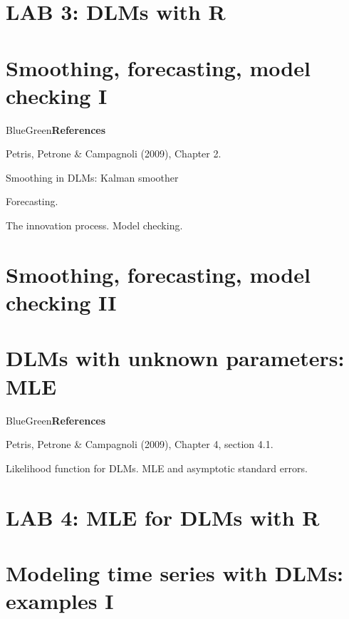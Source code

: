 \documentclass[dvipsnames,12pt]{book}
\begin{document}
    \chapter*{LAB 3: DLMs with R}


    \chapter{Smoothing, forecasting, model checking I}

        \begin{mybox}{BlueGreen}{\textbf{References}}

            Petris, Petrone \& Campagnoli (2009), Chapter 2.
            
        \end{mybox}

        Smoothing in DLMs: Kalman smoother

        Forecasting.

        The innovation process. Model checking.

    \chapter{Smoothing, forecasting, model checking II}


    \chapter{DLMs with unknown parameters: MLE}

        \begin{mybox}{BlueGreen}{\textbf{References}}

            Petris, Petrone \& Campagnoli (2009), Chapter 4, section 4.1.
            
        \end{mybox}

        Likelihood function for DLMs. MLE and asymptotic standard errors.

    \chapter*{LAB 4: MLE for DLMs with R}


    \chapter{Modeling time series with DLMs: examples I}
\end{document}
